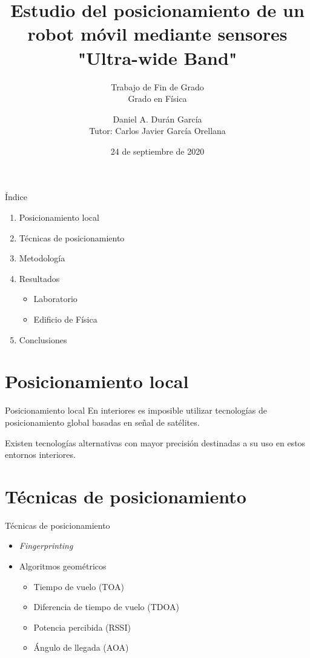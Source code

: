 \documentclass{beamer}
\title{Estudio del posicionamiento de un robot móvil mediante sensores "Ultra-wide Band"}
\subtitle{Trabajo de Fin de Grado \\ Grado en Física}
\date{24 de septiembre de 2020}
\author{Daniel A. Durán García \\ Tutor: Carlos Javier García Orellana}
\institute{Universidad de Extremadura}
\begin{document}



  \frame{\titlepage}
  \logo{}
  
  \begin{frame}{Índice}
    \begin{enumerate}
      \item Posicionamiento local
      \item Técnicas de posicionamiento
      \item Metodología
      \item Resultados
      \begin{itemize}
        \item Laboratorio
        \item Edificio de Física
      \end{itemize}
      \item Conclusiones
    \end{enumerate}
    \end{frame}


  \section{Posicionamiento local}
    \begin{frame}{Posicionamiento local}
      En interiores es imposible utilizar tecnologías de posicionamiento global basadas en señal de satélites.

      Existen tecnologías alternativas con mayor precisión destinadas a su uso en estos entornos interiores.
    \end{frame}

  \section{Técnicas de posicionamiento}

    \begin{frame}{Técnicas de posicionamiento}
    \begin{itemize}
      \item \textit{Fingerprinting}
      \item Algoritmos geométricos
      \begin{itemize}
        \item Tiempo de vuelo (TOA)
        \item Diferencia de tiempo de vuelo (TDOA)
        \item Potencia percibida (RSSI)
        \item Ángulo de llegada (AOA)
      \end{itemize}
    \end{itemize}
    \end{frame}
\end{document}
